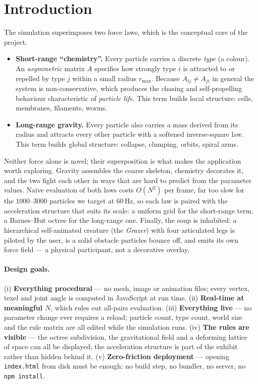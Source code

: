\documentclass[10pt,a4paper]{article}
\newcommand{\code}[1]{\texttt{\small #1}}
\newcommand{\file}[1]{\texttt{\small\color{accent!70!black}#1}}
\begin{document}
\section{Introduction}

The simulation superimposes two force laws, which is the conceptual core of the project.

\begin{itemize}[leftmargin=1.3em,itemsep=1pt,topsep=2pt]
  \item \textbf{Short-range ``chemistry''.} Every particle carries a discrete \emph{type} (a colour). An
        \emph{asymmetric} matrix $A$ specifies how strongly type $i$ is attracted to or repelled by type
        $j$ within a small radius $r_{\max}$. Because $A_{ij}\neq A_{ji}$ in general the system is
        non-conservative, which produces the chasing and self-propelling behaviour characteristic of
        \emph{particle life}. This term builds local structure: cells, membranes, filaments, worms.
  \item \textbf{Long-range gravity.} Every particle also carries a mass derived from its radius and
        attracts every other particle with a softened inverse-square law. This term builds global
        structure: collapse, clumping, orbits, spiral arms.
\end{itemize}

Neither force alone is novel; their superposition is what makes the application worth exploring. Gravity
assembles the coarse skeleton, chemistry decorates it, and the two fight each other in ways that are hard
to predict from the parameter values. Naive evaluation of both laws costs $O(N^2)$ per frame, far too slow
for the $1000$--$3000$ particles we target at 60\,Hz, so each law is paired with the acceleration structure
that suits its scale: a uniform grid for the short-range term, a Barnes--Hut octree for the long-range one.
Finally, the soup is inhabited: a hierarchical self-animated creature (the \emph{Grazer}) with four
articulated legs is piloted by the user, is a solid obstacle particles bounce off, and emits its own force
field --- a physical participant, not a decorative overlay.

\paragraph{Design goals.} (i) \textbf{Everything procedural} --- no mesh, image or animation files; every
vertex, texel and joint angle is computed in JavaScript at run time. (ii) \textbf{Real-time at meaningful
$N$}, which rules out all-pairs evaluation. (iii) \textbf{Everything live} --- no parameter change ever
requires a reload; particle count, type count, world size and the rule matrix are all edited while the
simulation runs. (iv) \textbf{The rules are visible} --- the octree subdivision, the gravitational field
and a deforming lattice of space can all be displayed; the acceleration structure is part of the exhibit
rather than hidden behind it. (v) \textbf{Zero-friction deployment} --- opening \file{index.html} from
disk must be enough: no build step, no bundler, no server, no \code{npm install}.
\end{document}

